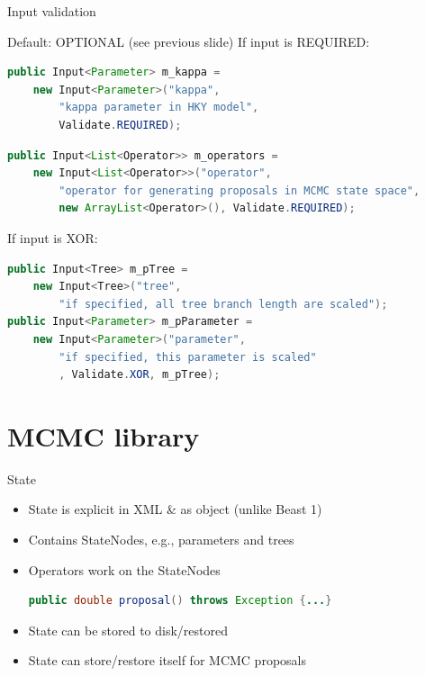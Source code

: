 \documentclass{beamer}
\theoremstyle{definition}
\begin{document}
\begin{frame}[containsverbatim]
{Input validation}

Default: OPTIONAL (see previous slide)
\vskip0.2cm
If input is REQUIRED:

\begin{lstlisting}[language=java]
public Input<Parameter> m_kappa = 
    new Input<Parameter>("kappa", 
        "kappa parameter in HKY model",
        Validate.REQUIRED);
\end{lstlisting}

\begin{lstlisting}[language=java]
public Input<List<Operator>> m_operators = 
    new Input<List<Operator>>("operator",
        "operator for generating proposals in MCMC state space",
        new ArrayList<Operator>(), Validate.REQUIRED);
\end{lstlisting}

If input is XOR:

\begin{lstlisting}[language=java]
public Input<Tree> m_pTree = 
    new Input<Tree>("tree", 
        "if specified, all tree branch length are scaled");
public Input<Parameter> m_pParameter = 
    new Input<Parameter>("parameter", 
        "if specified, this parameter is scaled"
        , Validate.XOR, m_pTree);
\end{lstlisting}

\end{frame}


\section{MCMC library}


\begin{frame}[containsverbatim]
{State}
\begin{itemize}
\item State is explicit in XML \& as object (unlike Beast 1)
\item Contains StateNodes, e.g., parameters and trees
\item Operators work on the StateNodes
\begin{lstlisting}[language=java]
public double proposal() throws Exception {...}
\end{lstlisting}
\item State can be stored to disk/restored
\item State can store/restore itself for MCMC proposals
\end{itemize}
\end{frame}
\end{document}
